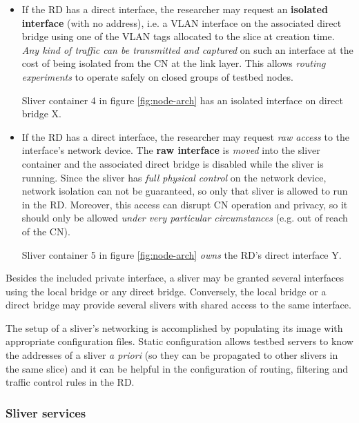 \documentclass[conference]{IEEEtran}
\begin{document}
\begin{itemize}

\item If the RD has a direct interface, the researcher may request an
  \textbf{isolated interface} (with no address), i.e. a VLAN interface on the
  associated direct bridge using one of the VLAN tags allocated to the slice
  at creation time.  \emph{Any kind of traffic can be transmitted and
    captured} on such an interface at the cost of being isolated from the CN
  at the link layer.  This allows \emph{routing experiments} to operate safely
  on closed groups of testbed nodes.

  Sliver container 4 in figure \ref{fig:node-arch} has an isolated interface
  on direct bridge X.

\item If the RD has a direct interface, the researcher may request \emph{raw
  access} to the interface's network device.  The \textbf{raw interface} is
  \emph{moved} into the sliver container and the associated direct bridge is
  disabled while the sliver is running.  Since the sliver has \emph{full
    physical control} on the network device, network isolation can not be
  guaranteed, so only that sliver is allowed to run in the RD.  Moreover, this
  access can disrupt CN operation and privacy, so it should only be allowed
  \emph{under very particular circumstances} (e.g. out of reach of the CN).

  Sliver container 5 in figure \ref{fig:node-arch} \emph{owns} the RD's direct
  interface Y.

\end{itemize}

Besides the included private interface, a sliver may be granted several
interfaces using the local bridge or any direct bridge.  Conversely, the local
bridge or a direct bridge may provide several slivers with shared access to
the same interface.

The setup of a sliver's networking is accomplished by populating its image
with appropriate configuration files.  Static configuration allows testbed
servers to know the addresses of a sliver \emph{a priori} (so they can be
propagated to other slivers in the same slice) and it can be helpful in the
configuration of routing, filtering and traffic control rules in the RD.

\subsubsection{Sliver services}
\label{sec:sliver-services}
\end{document}
